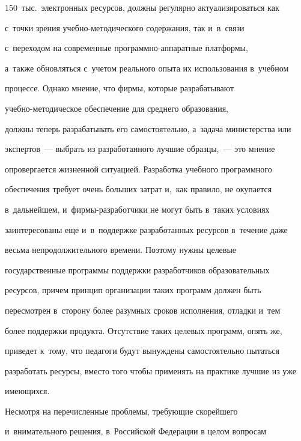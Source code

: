 150~тыс.\ электронных ресурсов, должны регулярно актуализироваться как


с~точки зрения учеб\-но-ме\-то\-ди\-че\-ско\-го содержания, так и~в~связи


с~переходом на современные про\-грам\-мно-ап\-па\-рат\-ные платформы,


а~так\-же обновляться с~учетом реального опыта их использования в~учебном


процессе. Однако мнение, что фирмы, которые разрабатывают


     учеб\-но-ме\-то\-ди\-че\-ское обеспечение для среднего образования,


должны теперь разрабатывать его самостоятельно, а~задача министерства или


экспертов~--- выбрать из разработанного лучшие образцы,~--- это мнение


опровергается жизненной ситуацией. Разработка учебного про\-грам\-мно\-го


обеспечения требует очень больших затрат и,~как правило, не окупается


в~дальнейшем, и~фир\-мы-раз\-ра\-бот\-чи\-ки не могут быть в~таких условиях


заинтересованы еще и~в~поддержке разработанных ресурсов в~течение даже


весьма непродолжительного времени. Поэтому нужны целевые


государственные программы поддержки разработчиков образовательных


ресурсов, причем принцип организации таких программ должен быть


пересмотрен в~сторону более разумных сроков исполнения, отладки и~тем


более поддержки продукта. Отсутствие таких целевых программ, опять же,


приведет к~тому, что педагоги будут вынуждены самостоятельно пытаться


разработать ресурсы, вместо того чтобы применять на практике лучшие из уже


име\-ющихся.


{





}





     Несмотря на перечисленные проблемы, требующие скорейшего


и~внимательного решения, в~Российской Федерации в целом вопросам



